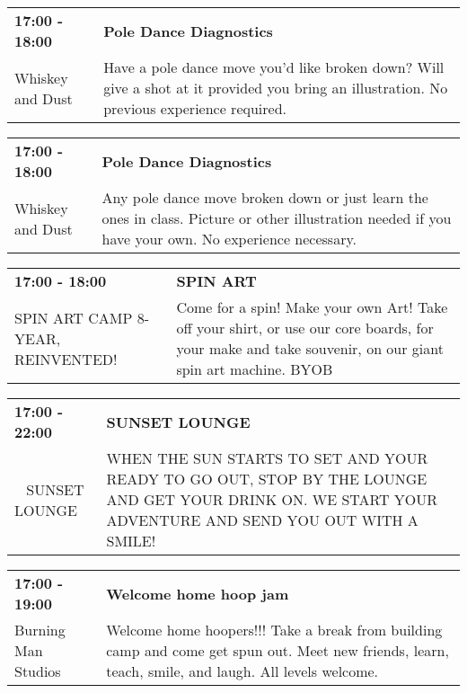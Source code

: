 \begin{tabular}{ p{1in} p{2.2in} }
    \textbf{17:00 - 18:00} & \textbf{Pole Dance Diagnostics} \\
    Whiskey and Dust \newline  & Have a pole dance move you'd like broken down? Will give a shot at it provided you bring an illustration. No previous experience required. \\
    \hline 
\end{tabular}
    
\begin{tabular}{ p{1in} p{2.2in} }
    \textbf{17:00 - 18:00} & \textbf{Pole Dance Diagnostics} \\
    Whiskey and Dust \newline  & Any pole dance move broken down or just learn the ones in class. Picture or other illustration needed if you have your own. No experience necessary. \\
    \hline 
\end{tabular}
    
\begin{tabular}{ p{1in} p{2.2in} }
    \textbf{17:00 - 18:00} & \textbf{SPIN ART} \\
    SPIN ART CAMP 8-YEAR, REINVENTED! \newline  & Come for a spin! Make your own Art! Take off your shirt, or use our core boards, for your make and take souvenir, on our giant spin art machine. BYOB \\
    \hline 
\end{tabular}
    
\begin{tabular}{ p{1in} p{2.2in} }
    \textbf{17:00 - 22:00} & \textbf{SUNSET LOUNGE} \\
    ~ \newline SUNSET LOUNGE & WHEN THE SUN STARTS TO SET AND YOUR READY TO GO OUT, STOP BY THE LOUNGE AND GET YOUR DRINK ON. WE START YOUR ADVENTURE AND SEND YOU OUT WITH A SMILE! \\
    \hline 
\end{tabular}
    
\begin{tabular}{ p{1in} p{2.2in} }
    \textbf{17:00 - 19:00} & \textbf{Welcome home hoop jam} \\
    Burning Man Studios \newline  & Welcome home hoopers!!! Take a break from building camp and come get spun out.  Meet new friends, learn, teach, smile, and laugh.  All levels welcome. \\
    \hline 
\end{tabular}
    
